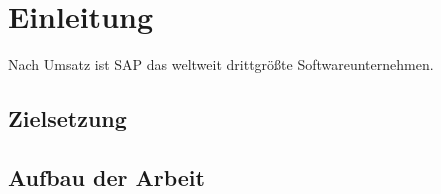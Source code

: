 \section{Einleitung}
Nach Umsatz ist SAP das weltweit drittgrößte Softwareunternehmen. 
\subsection{Zielsetzung}

\subsection{Aufbau der Arbeit}
